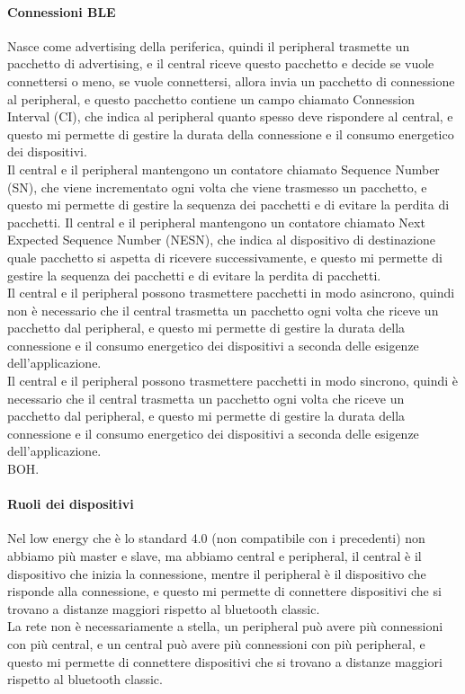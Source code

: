 \paragraph{Connessioni BLE}
Nasce come advertising della periferica, quindi il peripheral trasmette un pacchetto di advertising, e il central riceve questo pacchetto e decide se vuole connettersi o meno, se vuole connettersi, allora invia un pacchetto di connessione al peripheral, e questo pacchetto contiene un campo chiamato Connession Interval (CI), che indica al peripheral quanto spesso deve rispondere al central, e questo mi permette di gestire la durata della connessione e il consumo energetico dei dispositivi.\\
Il central e il peripheral mantengono un contatore chiamato Sequence Number (SN), che viene incrementato ogni volta che viene trasmesso un pacchetto, e questo mi permette di gestire la sequenza dei pacchetti e di evitare la perdita di pacchetti. Il central e il peripheral mantengono un contatore chiamato Next Expected Sequence Number (NESN), che indica al dispositivo di destinazione quale pacchetto si aspetta di ricevere successivamente, e questo mi permette di gestire la sequenza dei pacchetti e di evitare la perdita di pacchetti.\\
Il central e il peripheral possono trasmettere pacchetti in modo asincrono, quindi non è necessario che il central trasmetta un pacchetto ogni volta che riceve un pacchetto dal peripheral, e questo mi permette di gestire la durata della connessione e il consumo energetico dei dispositivi a seconda delle esigenze dell'applicazione.\\
Il central e il peripheral possono trasmettere pacchetti in modo sincrono, quindi è necessario che il central trasmetta un pacchetto ogni volta che riceve un pacchetto dal peripheral, e questo mi permette di gestire la durata della connessione e il consumo energetico dei dispositivi a seconda delle esigenze dell'applicazione.\\
BOH.

\paragraph{Ruoli dei dispositivi}
Nel low energy che è lo standard 4.0 (non compatibile con i precedenti) non abbiamo più master e slave, ma abbiamo central e peripheral, il central è il dispositivo che inizia la connessione, mentre il peripheral è il dispositivo che risponde alla connessione, e questo mi permette di connettere dispositivi che si trovano a distanze maggiori rispetto al bluetooth classic.\\
La rete non è necessariamente a stella, un peripheral può avere più connessioni con più central, e un central può avere più connessioni con più peripheral, e questo mi permette di connettere dispositivi che si trovano a distanze maggiori rispetto al bluetooth classic.\\

